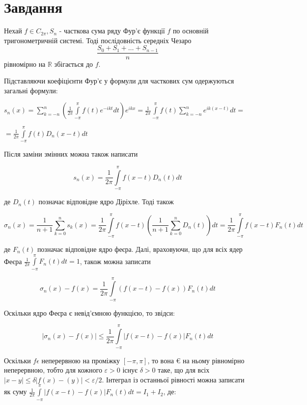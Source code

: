 
\chapter{Завдання \theHchapter}

\begin{tcolorbox}[title=Теорема Л.Фейєра]
    Нехай $f \in C_{2 \pi}, S_n$ - часткова сума ряду Фур'є функції $f$ по основній тригонометричній системі. Тоді послідовність середніх Чезаро
    $$
    \frac{S_0+S_1+\ldots+S_{n-1}}{n}
    $$
    рівномірно на $\mathbb{R}$ збігається до $f$.

\end{tcolorbox}



Підставляючи коефіцієнти Фур'є у формули для 
часткових сум одержуються загальні формули:

$s_n(x)=\sum\limits_{k=-n}^n(\frac{1}{2 \pi} \int\limits_{-\pi}^\pi 
f(t) e^{-i k t}d t) e^{i k x}=\frac{1}{2 \pi} \int\limits_{-\pi}^\pi 
f(t) \sum\limits_{k=-n}^n e^{i k(x-t)} d t=$


$=\frac{1}{2 \pi} \int\limits_{-\pi}^\pi f(t) D_n(x-t) dt$


Після заміни змінних можна також написати


$$s_n(x)=\frac{1}{2 \pi} \int\limits_{-\pi}^\pi f(x-t) D_n(t) d t$$


де $D_n(t)$ позначає відповідне ядро Діріхле.
Тоді також


$$\sigma_n(x)=\frac{1}{n+1} \sum\limits_{k=0}^n s_k(x)=\frac{1}{2 \pi} 
\int\limits_{-\pi}^\pi f(x-t)(\frac{1}{n+1} \sum\limits_{k=0}^n D_n(t)) 
d t=\frac{1}{2 \pi} \int\limits_{-\pi}^\pi f(x-t) F_n(t) d t$$


де $F_n(t)$ позначає відповідне ядро феєра.
Далі, враховуючи, що для всіх ядер Феєра 
$\frac{1}{2 \pi} \int\limits_{-\pi}^\pi F_n(t) d t=1$, також можна записати


$$\sigma_n(x)-f(x)=\frac{1}{2 \pi} 
\int\limits_{-\pi}^\pi(f(x-t)-f(x)) F_n(t) d t$$


Оскільки ядро Феєра є невід'ємною функцією, то звідси:


$$|\sigma_n(x)-f(x)| \leqslant \frac{1}{2 \pi} 
\int\limits_{-\pi}^\pi|f(x-t)-f(x)| F_n(t) d t$$


Оскільки $f \epsilon$ неперервною на проміжку $[-\pi, \pi]$, то вона $€$ 
на ньому рівномірно неперервною, тобто для кожного $\varepsilon>0$ існує 
$\delta>0$ таке, що для всіх $|x-y| \leqslant \delta
|f(x)-(y)|<\varepsilon / 2$. 
Інтеграл із останньої рівності можна записати як суму 
$\frac{1}{2 \pi} \int\limits_{-\pi}^\pi
|f(x-t)-f(x)| F_n(t) d t=I_1+I_2$, де:


